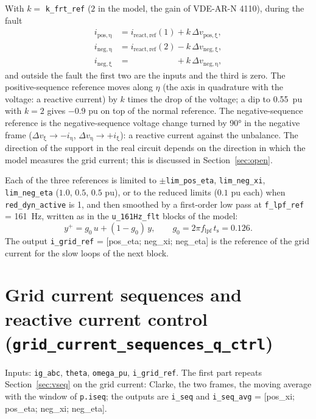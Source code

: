 \documentclass[11pt,a4paper]{scrartcl}
\newcommand{\ped}[1]{_{\mathrm{#1}}}
\newcommand{\code}[1]{\texttt{#1}}
\begin{document}
\begin{onehalfspace}
With $k = $ \code{k\_frt\_ref} ($2$ in the model, the gain of VDE-AR-N 4110), during the fault
\begin{equation}
	\begin{aligned}
		i\ped{pos,\eta} &= i\ped{react,ref}(1) + k\, \Delta v\ped{pos,\xi}, \\
		i\ped{neg,\eta} &= i\ped{react,ref}(2) - k\, \Delta v\ped{neg,\xi}, \\
		i\ped{neg,\xi}  &= \phantom{i\ped{react,ref}(2)} + k\, \Delta v\ped{neg,\eta},
	\end{aligned}
	\label{eq:frt_ref}
\end{equation}
and outside the fault the first two are the inputs and the third is zero. The positive-sequence reference moves along $\eta$ (the axis in quadrature with the voltage: a reactive current) by $k$ times the drop of the voltage; a dip to \SI{0.55}{pu} with $k = 2$ gives $-0.9$ pu on top of the normal reference. The negative-sequence reference is the negative-sequence voltage change turned by \ang{90} in the negative frame ($\Delta v\ped{\xi} \to -i\ped{\eta}$, $\Delta v\ped{\eta} \to +i\ped{\xi}$): a reactive current against the unbalance. The direction of the support in the real circuit depends on the direction in which the model measures the grid current; this is discussed in Section~\ref{sec:open}.

Each of the three references is limited to $\pm$\code{lim\_pos\_eta}, \code{lim\_neg\_xi}, \code{lim\_neg\_eta} ($1.0$, $0.5$, $0.5$ pu), or to the reduced limits ($0.1$ pu each) when \code{red\_dyn\_active} is 1, and then smoothed by a first-order low pass at \code{f\_lpf\_ref} = \SI{161}{\hertz}, written as in the \code{u\_161Hz\_flt} blocks of the model:
\begin{equation}
	y^{+} = g_0\, u + (1 - g_0)\, y, \qquad g_0 = 2\pi f\ped{lpf}\, t\ped{s} = 0.126.
	\label{eq:lpf161}
\end{equation}
The output \code{i\_grid\_ref} = [pos\_eta; neg\_xi; neg\_eta] is the reference of the grid current for the slow loops of the next block.

\section{Grid current sequences and reactive current control (\code{grid\_current\_sequences\_q\_ctrl})}
\label{sec:qctrl}

Inputs: \code{ig\_abc}, \code{theta}, \code{omega\_pu}, \code{i\_grid\_ref}. The first part repeats Section~\ref{sec:vseq} on the grid current: Clarke, the two frames, the moving average with the window of \code{p.iseq}; the outputs are \code{i\_seq} and \code{i\_seq\_avg} = [pos\_xi; pos\_eta; neg\_xi; neg\_eta].


\end{onehalfspace}
\end{document}
